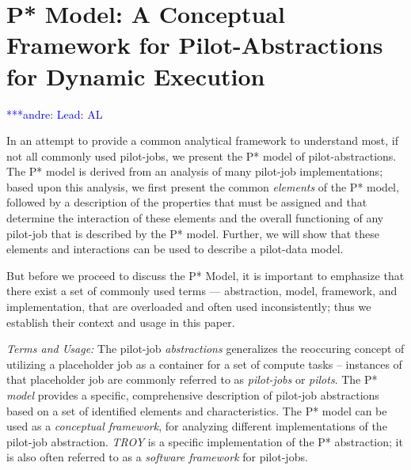 \documentclass[conference,final]{IEEEtran}
\newcommand{\alnote}[1]{ {\textcolor{blue} { ***andre: #1 }}}
\newcommand{\alnote}[1]{}
\newcommand{\upp}{\vspace*{-0.5em}}
\begin{document}
\section{P* Model: A Conceptual Framework for Pilot-Abstractions for
  Dynamic Execution \upp\upp}
\alnote{Lead: AL}
\label{sec:pilot-model}





In an attempt to provide a common analytical framework to understand
most, if not all commonly used pilot-jobs, we present the P* model of
pilot-abstractions. The P* model is derived from an analysis of many
pilot-job implementations; based upon this analysis, we first present
the common {\it elements} of the P* model, followed by a description
of the properties that must be assigned and that determine the
interaction of these elements and the overall functioning of any
pilot-job that is described by the P* model. Further, we will show
that these elements and interactions can be used to describe a
pilot-data model.
 
But before we proceed to discuss the P* Model, it is important to
emphasize that there exist a set of commonly used terms ---
abstraction, model, framework, and implementation, that are overloaded
and often used inconsistently; thus we establish their context and
usage in this paper.

\emph{Terms and Usage:} The pilot-job \emph{ abstractions} generalizes
the reoccuring concept of utilizing a placeholder job as a container
for a set of compute tasks -- instances of that placeholder job are
commonly referred to as \emph{pilot-jobs} or \emph{pilots}.  The P*
\emph{model} provides a specific, comprehensive description of
pilot-job abstractions based on a set of identified elements and
characteristics.  The P* model can be used as a {\it conceptual
  framework}, for analyzing different implementations of the pilot-job
abstraction. \emph{TROY} is a specific implementation of the P*
abstraction; it is also often referred to as a {\it software
  framework} for pilot-jobs.
\end{document}
